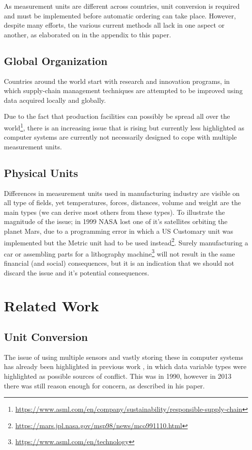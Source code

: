 \documentclass[sigchi, nonacm]{acmart}
\begin{document}
As measurement units are different across countries, unit conversion is required and must be implemented before automatic ordering can take place. However, despite many efforts, the various current methods all lack in one aspect or another, as elaborated on in the appendix to this paper.

\subsection{Global Organization}
Countries around the world start with research and innovation programs, in which supply-chain management techniques are attempted to be improved using data acquired locally and globally\cite{haverkort2017smart}.

Due to the fact that production facilities can possibly be spread all over the world\footnote{\raggedright\url{https://www.asml.com/en/company/sustainability/responsible-supply-chain}}, there is an increasing issue that is rising but currently less highlighted as computer systems are currently not necessarily designed to cope with multiple measurement units\cite{foster2013quantities}.

\subsection{Physical Units}
Differences in measurement units used in manufacturing industry are visible on all type of fields, yet temperatures, forces, distances, volume and weight are the main types (we can derive most others from these types). To illustrate the magnitude of the issue; in 1999 NASA lost one of it's satellites orbiting the planet Mars, due to a programming error in which a US Customary unit was implemented but the Metric unit had to be used instead\footnote{\raggedright\url{https://mars.jpl.nasa.gov/msp98/news/mco991110.html}}\cite{NASA}. Surely manufacturing a car or assembling parts for a lithography machine\footnote{\raggedright\url{https://www.asml.com/en/technology}} will not result in the same financial (and social) consequences, but it is an indication that we should not discard the issue and it's potential consequences.


\section{Related Work}
\subsection{Unit Conversion}
The issue of using multiple sensors and vastly storing these in computer systems has already been highlighted in previous work \cite{waltz1990multisensor}, in which data variable types were highlighted as possible sources of conflict. This was in 1990, however in 2013 there was still reason enough for concern, as \cite{foster2013quantities} described in his paper.
\end{document}

